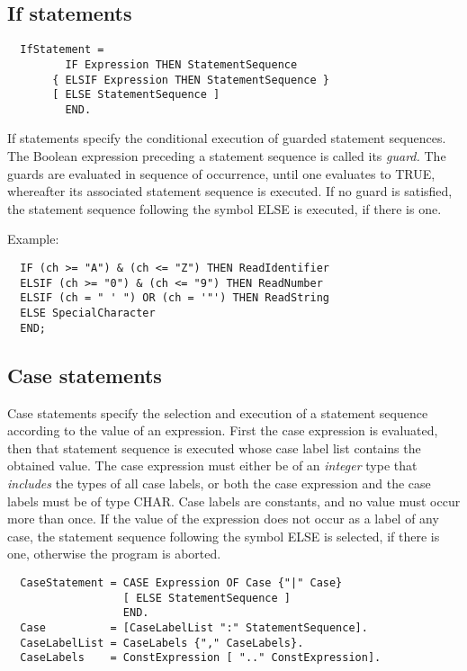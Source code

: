 \subsection{If statements}
{\BNFsize
\begin{verbatim}
  IfStatement =
         IF Expression THEN StatementSequence
       { ELSIF Expression THEN StatementSequence }
       [ ELSE StatementSequence ]
         END.
\end{verbatim}}
If statements specify the conditional execution of guarded
statement sequences. The Boolean expression preceding a statement
sequence is called its {\em guard.} The guards are evaluated in sequence
of occurrence, until one evaluates to TRUE, whereafter its associated
statement sequence is executed. If no guard is satisfied, the statement
sequence following the symbol ELSE is executed, if there is one.

\noindent
Example:
\begin{verbatim}
  IF (ch >= "A") & (ch <= "Z") THEN ReadIdentifier
  ELSIF (ch >= "0") & (ch <= "9") THEN ReadNumber
  ELSIF (ch = " ' ") OR (ch = '"') THEN ReadString
  ELSE SpecialCharacter
  END;
\end{verbatim}

\subsection{Case statements}

Case statements specify the selection and execution of a statement
sequence according to the value of an expression. First the case expression
is evaluated, then that statement sequence is executed whose case
label list contains the obtained value. The case expression must either
be of an {\em integer} type that {\em includes} the types of all case labels,
or both the case expression and the case labels must be of type CHAR.
Case labels are constants, and no value must occur more than once.
If the value of the expression does not occur as a label of any case,
the statement sequence following the symbol ELSE is selected, if there
is one, otherwise the program is aborted.
{\BNFsize
\begin{verbatim}
  CaseStatement = CASE Expression OF Case {"|" Case}
                  [ ELSE StatementSequence ]
                  END.
  Case          = [CaseLabelList ":" StatementSequence].
  CaseLabelList = CaseLabels {"," CaseLabels}.
  CaseLabels    = ConstExpression [ ".." ConstExpression].
\end{verbatim}}

